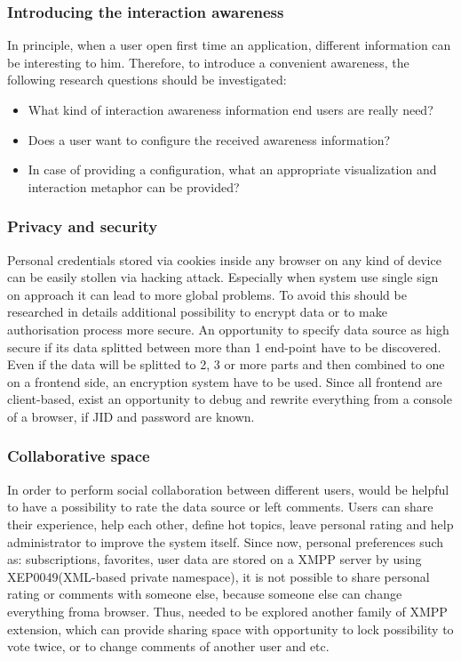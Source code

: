 		\subsubsection {Introducing the interaction awareness}
		In principle, when a user open first time an application, different information can be interesting to him. Therefore, to introduce a convenient awareness, the following research questions should be investigated:
		 \begin{itemize}
		\item What kind of interaction awareness information end users are really need?
		\item Does a user want to configure the received awareness information?
		\item In case of providing a configuration, what an appropriate visualization and interaction metaphor can be provided? 
		\end{itemize}

		\subsubsection{Privacy and security}
		Personal credentials stored via cookies inside any browser on any kind of device can be easily stollen via hacking attack. Especially when system use single sign on approach it can lead to more global problems. To avoid this should be researched in details additional possibility to encrypt data or to make authorisation process more secure.
        \newline
        An opportunity to specify data source as high secure if its data splitted between more than 1 end-point have to be discovered. Even if the data will be splitted to 2, 3 or more parts and then combined to one on a frontend side, an encryption system have to be used. Since all frontend are client-based, exist an opportunity to debug and rewrite everything from a console of a browser, if JID and password are known.

        \subsubsection{Collaborative space}
         In order to perform social collaboration between different users, would be helpful to have a possibility to rate the data source or left comments. Users can share their experience, help each other, define hot topics, leave personal rating and help administrator to improve the system itself. Since now, personal preferences such as: subscriptions, favorites, user data are stored on a XMPP server by using XEP0049(XML-based private namespace), it is not possible to share personal rating or comments with someone else, because someone else can change everything froma  browser. Thus, needed to be explored another family of XMPP extension, which can provide sharing space with opportunity to lock possibility to vote twice, or to change comments of another user and etc.  

